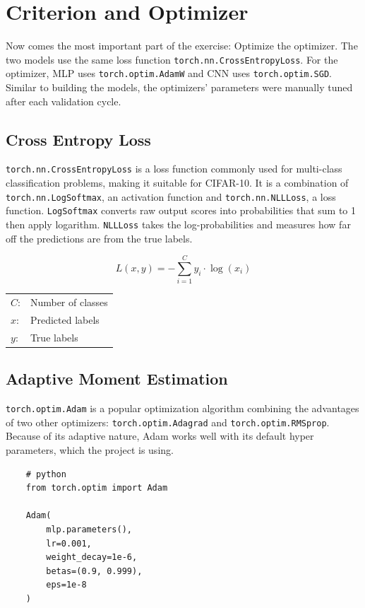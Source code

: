 \documentclass{report}
\begin{document}
\section{Criterion and Optimizer}
Now comes the most important part of the exercise: Optimize the optimizer. The two models use the same loss 
function \texttt{torch.nn.CrossEntropyLoss}. For the optimizer, MLP uses \texttt{torch.optim.AdamW} and CNN 
uses \texttt{torch.optim.SGD}. Similar to building the models, the optimizers' parameters were manually 
tuned after each validation cycle.

\subsection{Cross Entropy Loss}
\texttt{torch.nn.CrossEntropyLoss} is a loss function commonly used for multi-class classification problems, making 
it suitable for CIFAR-10. It is a combination of \texttt{torch.nn.LogSoftmax}, an activation function and 
\texttt{torch.nn.NLLLoss}, a loss function. \texttt{LogSoftmax} converts raw output scores into probabilities that sum to 
1 then apply logarithm. \texttt{NLLLoss} takes the log-probabilities and measures how far off the predictions are from 
the true labels. 

\[ L(x, y) = - \sum_{i=1}^{C} y_i \cdot \log(x_i) \]

\begin{center}
    \begin{tabular}{ll}
        $C$: & Number of classes  \\    
        $x$: & Predicted labels   \\
        $y$: & True labels        \\
    \end{tabular}
\end{center}

\subsection{Adaptive Moment Estimation}
\texttt{torch.optim.Adam} is a popular optimization algorithm combining the advantages of two other optimizers: 
\texttt{torch.optim.Adagrad} and \texttt{torch.optim.RMSprop}. Because of its adaptive nature, Adam works well 
with its default hyper parameters, which the project is using.

\begin{verbatim}
    # python
    from torch.optim import Adam

    Adam(
        mlp.parameters(),
        lr=0.001,
        weight_decay=1e-6,
        betas=(0.9, 0.999),
        eps=1e-8
    )
\end{verbatim}
\end{document}
